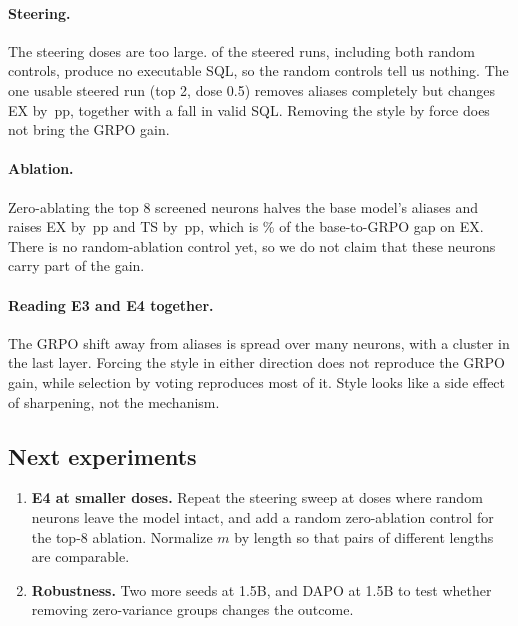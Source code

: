 \documentclass[11pt]{article}
\newcommand{\pp}{\,pp}
\begin{document}
\paragraph{Steering.} The steering doses are too large. \EfourBroken{} of the
\EfourSteered{} steered runs, including both random controls, produce no
executable SQL, so the random controls tell us nothing. The one usable steered
run (top 2, dose 0.5) removes aliases completely but changes EX by
\dEfourTopTwoHalfTs\pp{}, together with a fall in valid SQL. Removing the style
by force does not bring the GRPO gain.

\paragraph{Ablation.} Zero-ablating the top 8 screened neurons halves the base
model's aliases and raises EX by \dEfourZeroTs\pp{} and TS by
\dEfourZeroSuite\pp, which is \EfourZeroShareTs\% of the base-to-GRPO gap on
EX. There is no random-ablation control yet, so we do not claim that these
neurons carry part of the gain.

\paragraph{Reading E3 and E4 together.} The GRPO shift away from aliases is
spread over many neurons, with a cluster in the last layer. Forcing the style in either direction
does not reproduce the GRPO gain, while selection by voting reproduces most of
it. Style looks like a side effect of sharpening, not the mechanism.

\subsection{Next experiments}
\label{sec:next}

\begin{enumerate}
  \item \textbf{E4 at smaller doses.} Repeat the steering sweep at doses where
        random neurons leave the model intact, and add a random zero-ablation
        control for the top-8 ablation. Normalize $m$ by length so that pairs
        of different lengths are comparable.
  \item \textbf{Robustness.} Two more seeds at 1.5B, and DAPO at 1.5B to test
        whether removing zero-variance groups changes the outcome.
\end{enumerate}



\end{document}
